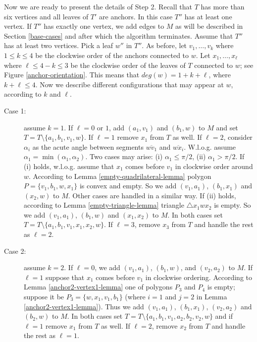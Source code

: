 \documentclass[11pt,a4paper]{article}
\begin{document}
Now we are ready to present the details of Step 2. Recall that $T$ has more than six vertices and all leaves of $T'$ are anchors. In this case $T''$ has at least one vertex. If $T''$ has exactly one vertex, we add edges to $M$ as will be described in Section \ref{base-cases} and after which the algorithm terminates. Assume that $T''$ has at least two vertices. Pick a leaf $w''$ in $T''$. As before, let $v_1,\dots,v_k$ where $1\le k \le 4$ be the clockwise order of the anchors connected to $w$. Let $x_1,\dots,x_{\ell}$ where $\ell \le 4-k\le3$ be the clockwise order of the leaves of $T$ connected to $w$; see Figure \ref{anchor-orientation}. This means that $deg(w)=1+k+\ell$, where $k+\ell \le 4$. Now we describe different configurations that may appear at $w$, according to $k$ and $\ell$.
 \begin{description}
  \item[Case 1:] assume $k=1$. If $\ell=0$ or $1$, add $(a_1,v_1)$ and $(b_1,w)$ to $M$ and set $T=T\setminus\{a_1,\allowbreak b_1,\allowbreak v_1,\allowbreak w\}$. If $\ell=1$ remove $x_1$ from $T$ as well. If $\ell=2$, consider $\alpha_i$ as the acute angle between segments $\overline{wv_1}$ and $\overline{wx_i}$. W.l.o.g. assume $\alpha_1 = \min(\alpha_1,\alpha_2)$. Two cases may arise: (i) $\alpha_1\le \pi/2$, (ii) $\alpha_1> \pi/2$. If (i) holds, w.l.o.g. assume that $x_1$ comes before $v_1$ in clockwise order around $w$. According to Lemma \ref{empty-quadrilateral-lemma} polygon $P=\{v_1, b_1, w, x_1\}$ is convex and empty. So we add $(v_1,a_1)$, $(b_1,x_1)$ and $(x_2,w)$ to $M$. Other cases are handled in a similar way. If (ii) holds, according to Lemma \ref{empty-triangle-lemma} triangle $\bigtriangleup x_1wx_2$ is empty. So we add $(v_1, a_1)$, $(b_1,w)$ and $(x_1,x_2)$ to $M$. In both cases set $T=T\setminus\{a_1,b_1,v_1, x_1, x_2, w\}$. If $\ell=3$, remove $x_3$ from $T$ and handle the rest as $\ell=2$.
  \item[Case 2:] assume $k=2$. If $\ell = 0$, we add $(v_1, a_1)$, $(b_1, w)$, and $(v_2, a_2)$ to $M$. If $\ell = 1$ suppose that $x_1$ comes before $v_1$ in clockwise ordering. According to Lemma \ref{anchor2-vertex1-lemma} one of polygons $P_3$ and $P_4$ is empty; suppose it be $P_3=\{w,x_1,v_1,b_1\}$ (where $i=1$ and $j=2$ in Lemma \ref{anchor2-vertex1-lemma}). Thus we add $(v_1, a_1)$, $(b_1,x_1)$, $(v_2,a_2)$ and $(b_2,w)$ to $M$. In both cases set $T=T\setminus\{a_1,\allowbreak b_1,\allowbreak v_1, \allowbreak a_2,b_2,v_2,\allowbreak w\}$ and if $\ell = 1$ remove $x_1$ from $T$ as well. If $\ell = 2$, remove $x_2$ from $T$ and handle the rest as $\ell=1$.

\end{description}
\end{document}

